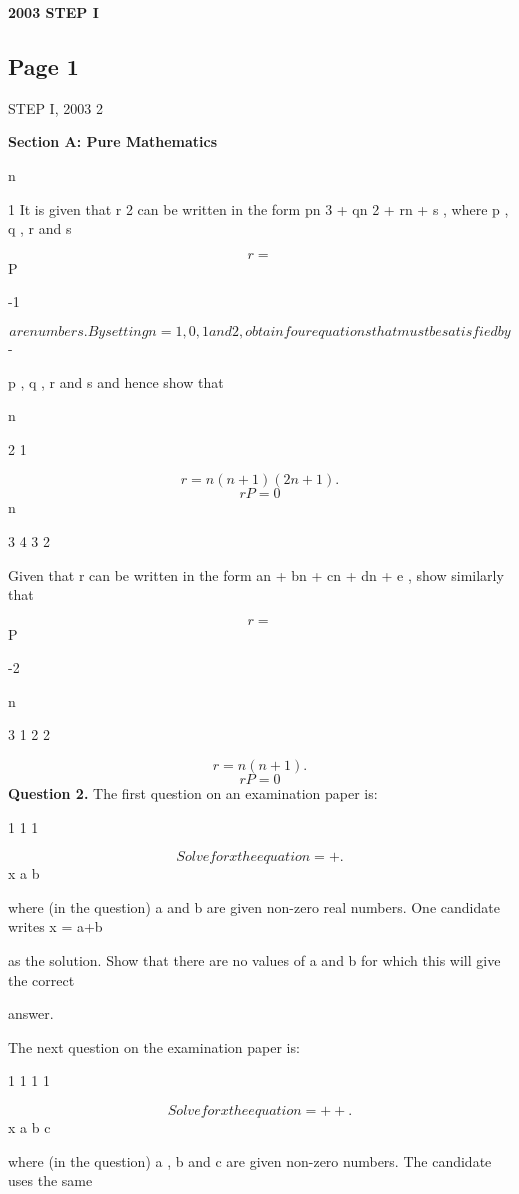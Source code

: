 \documentclass[12pt]{article}
\begin{document}
\begin{center}
{\Large \textbf{2003 STEP I}}
\end{center}

\subsection*{Page 1}
\begin{flushleft}
STEP I, 2003 2\par
\bigskip\textbf{Section A: Pure Mathematics}\par
n\par
1 It is given that r 2 can be written in the form pn 3 + qn 2 + rn + s , where p , q , r and s\par
\[r=\]
P\par
-1\par
\[are numbers. By setting n = 1, 0, 1 and 2, obtain four equations that must be satisfied by\]
-\par
p , q , r and s and hence show that\par
n\par
2 1\par
\[r = n(n + 1)(2n + 1) .\]
\[rP =0\]
n\par
3 4 3 2\par
Given that r can be written in the form an + bn + cn + dn + e , show similarly that\par
\[r=\]
P\par
-2\par
n\par
3 1 2 2\par
\[r = n (n + 1) .\]
\[rP =0\]
\bigskip\textbf{Question 2.} The first question on an examination paper is:\par
1 1 1\par
\[Solve for x the equation = + .\]
x a b\par
where (in the question) a and b are given non-zero real numbers. One candidate writes x = a+b\par
as the solution. Show that there are no values of a and b for which this will give the correct\par
answer.\par
The next question on the examination paper is:\par
1 1 1 1\par
\[Solve for x the equation = + + .\]
x a b c\par
where (in the question) a , b and c are given non-zero numbers. The candidate uses the same\par

\end{flushleft}
\end{document}
